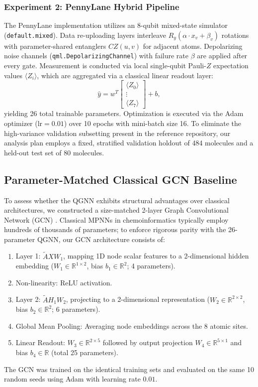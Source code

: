 \documentclass[sn-apacite,Numbered]{sn-jnl}
\begin{document}
\subsubsection{Experiment 2: PennyLane Hybrid Pipeline}
The PennyLane implementation utilizes an 8-qubit mixed-state simulator (\texttt{default.mixed}). Data re-uploading layers interleave $R_y(\alpha \cdot x_v + \beta_v)$ rotations with parameter-shared entanglers $CZ(u, v)$ for adjacent atoms. Depolarizing noise channels (\texttt{qml.DepolarizingChannel}) with failure rate $\beta$ are applied after every gate. Measurement is conducted via local single-qubit Pauli-$Z$ expectation values $\langle Z_i \rangle$, which are aggregated via a classical linear readout layer:
\begin{equation}
\hat{y} = w^T \begin{bmatrix} \langle Z_0 \rangle \\ \vdots \\ \langle Z_7 \rangle \end{bmatrix} + b,
\end{equation}
yielding 26 total trainable parameters. Optimization is executed via the Adam optimizer ($\text{lr} = 0.01$) over 10 epochs with mini-batch size 16. To eliminate the high-variance validation subsetting present in the reference repository, our analysis plan employs a fixed, stratified validation holdout of 484 molecules and a held-out test set of 80 molecules.

\subsection{Parameter-Matched Classical GCN Baseline}
To assess whether the QGNN exhibits structural advantages over classical architectures, we constructed a size-matched 2-layer Graph Convolutional Network (GCN) \cite{kipf2017semi}. Classical MPNNs in chemoinformatics typically employ hundreds of thousands of parameters; to enforce rigorous parity with the 26-parameter QGNN, our GCN architecture consists of:
\begin{enumerate}
    \item Layer 1: $\tilde{A} X W_1$, mapping 1D node scalar features to a 2-dimensional hidden embedding ($W_1 \in \mathbb{R}^{1 \times 2}$, bias $b_1 \in \mathbb{R}^2$; 4 parameters).
    \item Non-linearity: ReLU activation.
    \item Layer 2: $\tilde{A} H_1 W_2$, projecting to a 2-dimensional representation ($W_2 \in \mathbb{R}^{2 \times 2}$, bias $b_2 \in \mathbb{R}^2$; 6 parameters).
    \item Global Mean Pooling: Averaging node embeddings across the 8 atomic sites.
    \item Linear Readout: $W_3 \in \mathbb{R}^{2 \times 5}$ followed by output projection $W_4 \in \mathbb{R}^{5 \times 1}$ and bias $b_4 \in \mathbb{R}$ (total 25 parameters).
\end{enumerate}
The GCN was trained on the identical training sets and evaluated on the same 10 random seeds using Adam with learning rate $0.01$.
\end{document}
